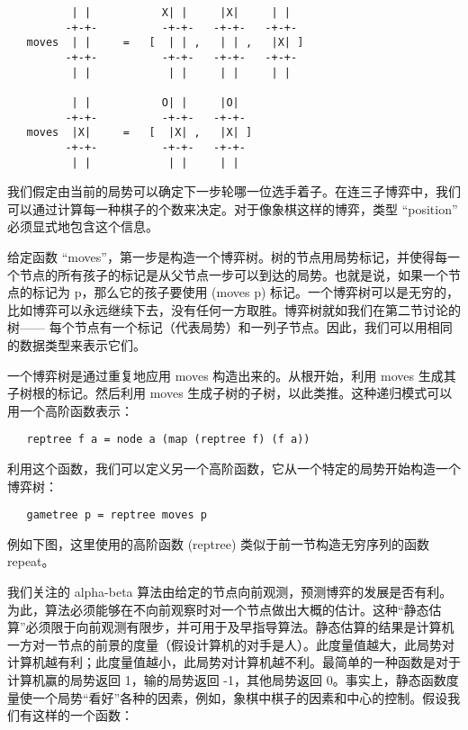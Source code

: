 \documentclass[12pt,a4paper]{article}
\begin{document}
\begin{verbatim}
          | |           X| |     |X|     | |
         -+-+-          -+-+-   -+-+-   -+-+-
   moves  | |     =   [  | | ,   | | ,   |X| ]
         -+-+-          -+-+-   -+-+-   -+-+-
          | |            | |     | |     | |

          | |           O| |     |O|
         -+-+-          -+-+-   -+-+-
   moves  |X|     =   [  |X| ,   |X| ]
         -+-+-          -+-+-   -+-+-
          | |            | |     | |
\end{verbatim}

我们假定由当前的局势可以确定下一步轮哪一位选手着子。在连三子博弈中，我们可以通过计算每一种棋子的个数来决定。对于像象棋这样的博弈，类型 ``position'' 必须显式地包含这个信息。

给定函数 ``moves''，第一步是构造一个博弈树。树的节点用局势标记，并使得每一个节点的所有孩子的标记是从父节点一步可以到达的局势。也就是说，如果一个节点的标记为 p，那么它的孩子要使用 (moves p) 标记。一个博弈树可以是无穷的，比如博弈可以永远继续下去，没有任何一方取胜。博弈树就如我们在第二节讨论的树—— 每个节点有一个标记（代表局势）和一列子节点。因此，我们可以用相同的数据类型来表示它们。

一个博弈树是通过重复地应用 moves 构造出来的。从根开始，利用 moves 生成其子树根的标记。然后利用 moves 生成子树的子树，以此类推。这种递归模式可以用一个高阶函数表示：

\begin{verbatim}
   reptree f a = node a (map (reptree f) (f a))
\end{verbatim}

利用这个函数，我们可以定义另一个高阶函数，它从一个特定的局势开始构造一个博弈树：

\begin{verbatim}
   gametree p = reptree moves p
\end{verbatim}

例如下图，这里使用的高阶函数 (reptree) 类似于前一节构造无穷序列的函数 repeat。

我们关注的 alpha-beta 算法由给定的节点向前观测，预测博弈的发展是否有利。为此，算法必须能够在不向前观察时对一个节点做出大概的估计。这种``静态估算''必须限于向前观测有限步，并可用于及早指导算法。静态估算的结果是计算机一方对一节点的前景的度量（假设计算机的对手是人）。此度量值越大，此局势对计算机越有利；此度量值越小，此局势对计算机越不利。最简单的一种函数是对于计算机赢的局势返回 1，输的局势返回 -1，其他局势返回 0。事实上，静态函数度量使一个局势``看好''各种的因素，例如，象棋中棋子的因素和中心的控制。假设我们有这样的一个函数：
\end{document}

